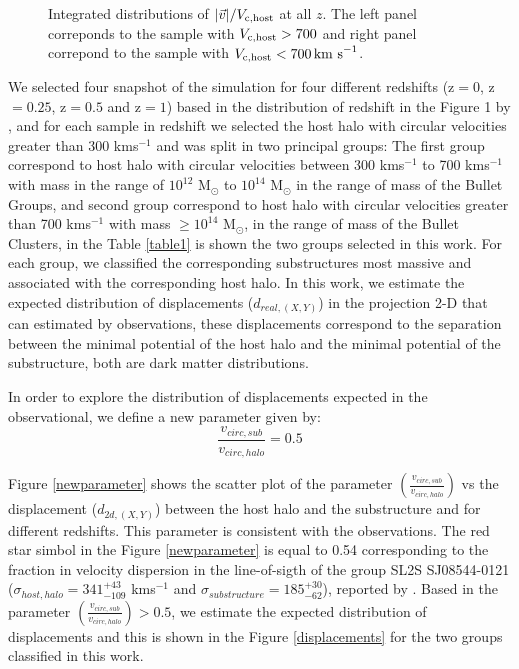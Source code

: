 \documentclass{emulateapj}
\newcommand{\kms}{{\ifmmode{{\mathrm{\,km\ s}^{-1}}}\else{\,km~s$^{-1}$}\fi}}
\begin{document}
\begin{figure}
\begin{center}
\end{center}
\caption{Integrated distributions of $|\vec{v}|/V_{\rm c,host}$ at all
  $z$. The left panel correponds to the sample with $V_{\rm c, host}>700$ \kms and
  right panel correpond to the sample with $V_{\rm c,host}<700\kms$.} 
\label{cos_theta2}
\end{figure}



We selected four snapshot of the simulation for four different
redshifts (z$=0$, z$=0.25$, z$=0.5$ and z$=1$) based in the
distribution of redshift in the Figure 1 by \citet{verdugo}, and  for
each sample in redshift we selected the host halo with circular
velocities greater than 300 kms$^{-1}$ and was split in two  principal
groups: The first group correspond to host halo with circular
velocities between 300 kms$^{-1}$ to 700 kms${^{-1}}$ with mass in the
range of $10^{12}$ M$_\odot{}$ to $10^{14}$ M$_\odot{}$ in the range
of mass of the Bullet Groups, and second group correspond to host halo
with circular velocities greater than 700 kms$^{-1}$ with mass
$\geq10^{14}$ M$_\odot{}$, in the range of mass of the Bullet
Clusters, in  the Table \ref{table1} is shown the two groups selected
in this work. For each group, we  classified the corresponding
substructures most massive and associated with the corresponding host
halo.  In  this work,
we estimate the expected distribution of displacements
($d_{real,(X,Y)}$) in the projection 2-D that can estimated by
observations, these displacements correspond to the separation between
the minimal potential of the host halo and the  minimal potential of
the substructure, both are dark matter distributions. 



In order to explore the distribution of displacements expected in the observational, we define a new parameter given by:\\

\begin{equation}
 \frac{v_{circ,sub}}{v_{circ,halo}}=0.5
\end{equation}
 

Figure \ref{newparameter} shows the scatter plot of the parameter $\left(\frac{v_{circ,sub}}{v_{circ,halo}}\right)$ vs the 
displacement ($d_{2d,(X,Y)}$) between the host halo and the substructure and for different redshifts. This parameter is 
consistent with the observations. The red star simbol in the Figure \ref{newparameter} is equal to 0.54 corresponding to 
the fraction in velocity dispersion in the line-of-sigth of the group SL2S SJ08544-0121 ($\sigma_{host,halo}=341^{+43}_{-109}$ kms$^{-1}$ and $\sigma_{substructure}=185^{+30}_{-62}$), reported by \citet{2013A&A...552A..80M}.
Based in the parameter $\left(\frac{v_{circ,sub}}{v_{circ,halo}}\right)>0.5$, we estimate the expected distribution of
displacements and this is shown in the Figure \ref{displacements} for the two groups classified in this work.
 
\end{document}
